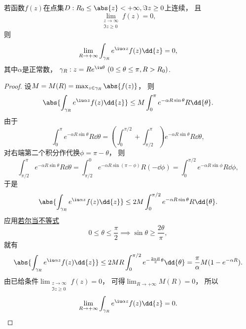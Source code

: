 \begin{lemma}[若尔当引理]\label{theorem:留数定理.计算积分路径上没有奇点的无穷限积分.引理2}
若函数\(f(z)\)在点集\(D: R_0 \leq \abs{z} < +\infty, \Im z \geq 0\)上连续，
且\begin{equation*}
	\lim_{\substack{z\to\infty \\ \Im z \geq 0}} f(z) = 0,
\end{equation*}
则\begin{equation}
	\lim_{R\to+\infty} \int_{\gamma_R} e^{\iu\alpha z} f(z) \dd{z} = 0,
\end{equation}
其中\(\alpha\)是正常数，
\(\gamma_R: z = R e^{\iu\theta}\ (0\leq\theta\leq\pi, R>R_0)\).
\begin{proof}
设\(M = M(R) = \max_{z \in \gamma_R} \abs{f(z)}\)，
则\begin{equation*}
	\abs{ \int_{\gamma_R} e^{\iu\alpha z} f(z) \dd{z} }
	\leq M \int_0^\pi e^{-\alpha R \sin\theta} R \dd{\theta}.
\end{equation*}
由于\begin{equation*}
	\int_0^\pi e^{-\alpha R \sin\theta} R \dd{\theta}
	= \left(\int_0^{\pi/2} + \int_{\pi/2}^\pi\right)
	e^{-\alpha R \sin\theta} R \dd{\theta},
\end{equation*}
对右端第二个积分作代换\(\phi=\pi-\theta\)，
则\begin{equation*}
	\int_{\pi/2}^\pi e^{-\alpha R \sin\theta} R \dd{\theta}
	= \int_{\pi/2}^0 e^{-\alpha R \sin(\pi-\phi)} R (-\dd{\phi})
	= \int_0^{\pi/2} e^{-\alpha R \sin\phi} R \dd{\phi},
\end{equation*}
于是\begin{equation*}
	\abs{ \int_{\gamma_R} e^{\iu\alpha z} f(z) \dd{z} }
	\leq 2M \int_0^{\pi/2} e^{-\alpha R \sin\theta} R \dd{\theta}.
\end{equation*}
应用\hyperref[equation:微分中值定理.若尔当不等式]{若尔当不等式}\begin{equation*}
	0\leq\theta\leq\frac{\pi}{2}
	\implies
	\sin\theta\geq\frac{2\theta}{\pi},
\end{equation*}
就有\begin{equation*}
	\abs{ \int_{\gamma_R} e^{\iu\alpha z} f(z) \dd{z} }
	\leq 2MR \int_0^{\pi/2} e^{-\frac{2\alpha R}{\pi}\theta} \dd{\theta}
	= \frac{\pi}{\alpha} M (1-e^{-\alpha R}).
\end{equation*}
由已给条件\(\lim_{\substack{z\to\infty \\ \Im z \geq 0}} f(z) = 0\)，
可得\(\lim_{R\to+\infty} M(R) = 0\)，
所以\begin{equation*}
	\lim_{R\to+\infty} \int_{\gamma_R} e^{\iu\alpha z} f(z) \dd{z} = 0.
	\qedhere
\end{equation*}
\end{proof}
\end{lemma}

